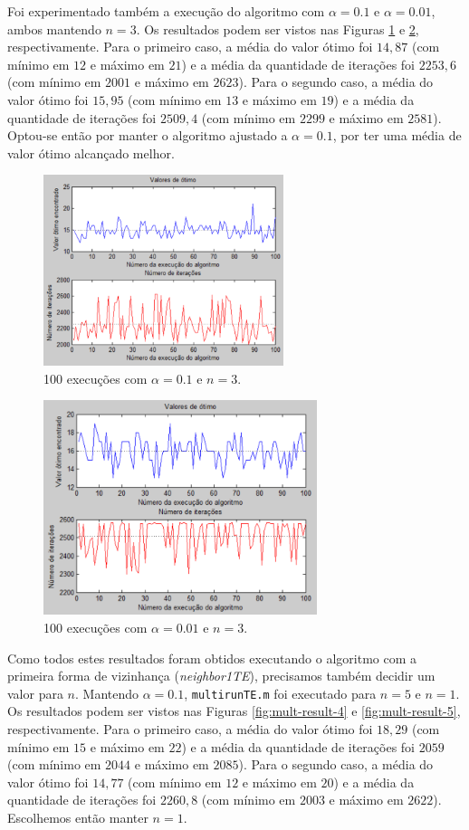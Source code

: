 \documentclass[conference]{IEEEtran}
\begin{document}
Foi experimentado também a execução do algoritmo com $\alpha = 0.1$ e $\alpha = 0.01$, ambos mantendo $n = 3$. Os resultados podem ser vistos nas Figuras \ref{fig:mult-result-2} e \ref{fig:mult-result-3}, respectivamente. Para o primeiro caso, a média do valor ótimo foi $14,87$ (com mínimo em $12$ e máximo em $21$) e a média da quantidade de iterações foi $2253,6$ (com mínimo em $2001$ e máximo em $2623$). Para o segundo caso, a média do valor ótimo foi $15,95$ (com mínimo em $13$ e máximo em $19$) e a média da quantidade de iterações foi $2509,4$ (com mínimo em $2299$ e máximo em $2581$). Optou-se então por manter o algoritmo ajustado a $\alpha = 0.1$, por ter uma média de valor ótimo alcançado melhor.

	\begin{figure}[h]
		\centering
		\includegraphics[width=7cm]{img/mult-result-2.png}
		\caption{100 execuções com $\alpha = 0.1$ e $n = 3$.}
		\label{fig:mult-result-2}
	\end{figure}
	
	\begin{figure}[h]
		\centering
		\includegraphics[width=8cm]{img/mult-result-3.png}
		\caption{100 execuções com $\alpha = 0.01$ e $n = 3$.}
		\label{fig:mult-result-3}
	\end{figure}
	\newpage
Como todos estes resultados foram obtidos executando o algoritmo com a primeira forma de vizinhança (\textit{neighbor1TE}), precisamos também decidir um valor para $n$. Mantendo $\alpha = 0.1$, \texttt{multirunTE.m} foi executado para $n = 5$ e $n = 1$. Os resultados podem ser vistos nas Figuras \ref{fig:mult-result-4} e \ref{fig:mult-result-5}, respectivamente. Para o primeiro caso, a média do valor ótimo foi $18,29$ (com mínimo em $15$ e máximo em $22$) e a média da quantidade de iterações foi $2059$ (com mínimo em $2044$ e máximo em $2085$). Para o segundo caso, a média do valor ótimo foi $14,77$ (com mínimo em $12$ e máximo em $20$) e a média da quantidade de iterações foi $2260,8$ (com mínimo em $2003$ e máximo em $2622$). Escolhemos então manter $n = 1$.
\end{document}

